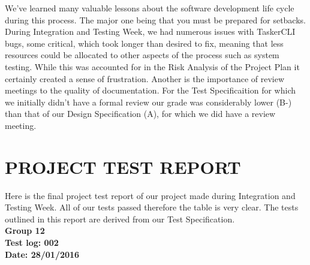 \documentclass{project}
\begin{document}
We've learned many valuable lessons about the software development life cycle during this process. The major one being that you must be prepared for setbacks. During Integration and Testing Week, we had numerous issues with TaskerCLI bugs, some critical, which took longer than desired to fix, meaning that less resources could be allocated to other aspects of the process such as system testing. While this was accounted for in the Risk Analysis of the Project Plan\cite{se.qa.pp} it certainly created a sense of frustration. Another is the importance of review meetings to the quality of documentation. For the Test Specificaition for which we initially didn't have a formal review our grade was considerably lower (B-) than that of our Design Specification (A), for which we did have a review meeting.
\clearpage

\section{PROJECT TEST REPORT}
Here is the final project test report of our project made during Integration and Testing Week. All of our tests passed therefore the table is very clear. The tests outlined in this report are derived from our Test Specification\cite{se.qa.ts}. \\

\textbf{Group 12} \\
\textbf{Test log: 002} \\
\textbf{Date: 28/01/2016} \\
\end{document}
